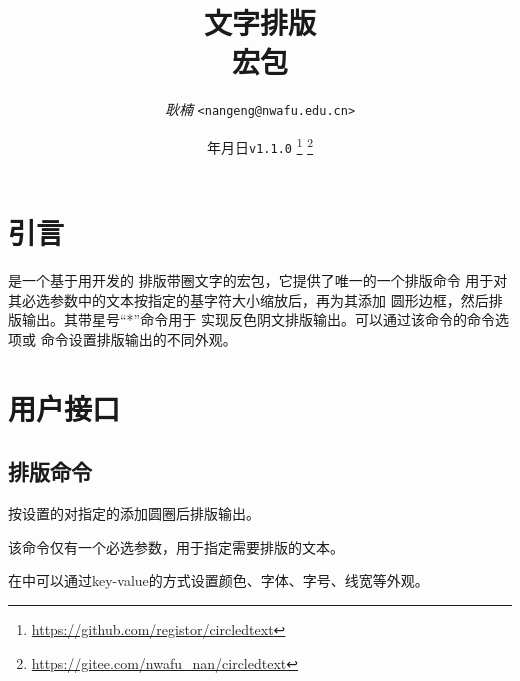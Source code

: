 \documentclass[full]{l3doc}
\def\vers{\texttt{v1.1.0} }
\begin{document}
\title{
  文字排版\\ 宏包
}
\author{\textit{耿楠} \texttt{<nangeng@nwafu.edu.cn>}}
\date{\the\year 年\the\month 月\the\day 日\qquad \vers
\thanks{\url{https://github.com/registor/circledtext}}
\thanks{\url{https://gitee.com/nwafu_nan/circledtext}}
}
\maketitle

{\small
\tableofcontents
}
\newpage

\begin{documentation}

\section{引言}

是一个基于用开发的
排版带圈文字的宏包，它提供了唯一的一个排版命令%
用于对其必选参数中的文本按指定的基字符大小缩放后，再为其添加
圆形边框，然后排版输出。其带星号``*''命令用于
实现反色阴文排版输出。可以通过该命令的命令选项或%
命令设置排版输出的不同外观。

\section{用户接口}

\subsection{排版命令}

\begin{function}{\circledtext}
  \begin{syntax}
      
  \end{syntax}
\end{function}

  按设置的对指定的添加圆圈后排版输出。

  该命令仅有一个必选参数，用于指定需要排版的文本。

  在中可以通过key-value的方式设置颜色、字体、字号、线宽等外观。


\end{documentation}
\end{document}

